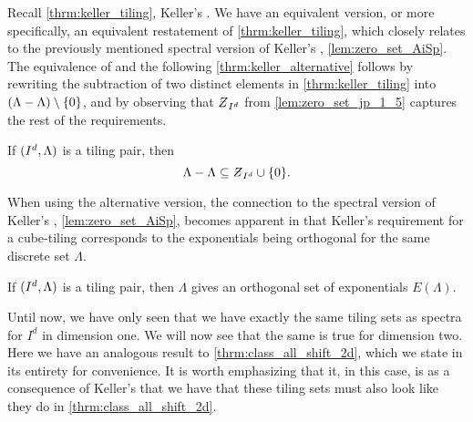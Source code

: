\documentclass[../thesis.tex]{subfiles}
\begin{document}
Recall \cref{thrm:keller_tiling}, Keller's . We have an equivalent version, or more specifically, an equivalent restatement of \cref{thrm:keller_tiling}, which closely relates to the previously mentioned spectral version of Keller's , \cref{lem:zero_set_AiSp}. The equivalence of  and the following \cref{thrm:keller_alternative} follows by rewriting the subtraction of two distinct elements in \cref{thrm:keller_tiling} into $(\Lambda-\Lambda)\setminus\{0\}$, and by observing that $\Zstroke_{I^d}$ from \cref{lem:zero_set_jp_1_5} captures the rest of the requirements.

\begin{theorem}\label{thrm:keller_alternative}
    If $(I^d,\Lambda)$ is a tiling pair, then 
    \begin{equation*}
        \Lambda - \Lambda \subseteq \Zstroke_{I^d} \cup \braq{0}.
    \end{equation*} 
\end{theorem}

When using the alternative version, the connection to the spectral version of Keller's , \cref{lem:zero_set_AiSp}, becomes apparent in that Keller's requirement for a cube-tiling corresponds to the exponentials being orthogonal for the same discrete set $\Lambda$.

\begin{corollary}\label{cor:tiling_pair_implies_orthogonal}
    If $(I^d, \Lambda)$ is a tiling pair, then $\Lambda$ gives an orthogonal set of exponentials $E(\Lambda)$.
\end{corollary}

Until now, we have only seen that we have exactly the same tiling sets as spectra for $I^d$ in dimension one. We will now see that the same is true for dimension two. Here we have an analogous result to \cref{thrm:class_all_shift_2d}, which we state in its entirety for convenience. It is worth emphasizing that it, in this case, is as a consequence of Keller's  that we have that these tiling sets must also look like they do in \cref{thrm:class_all_shift_2d}.
\end{document}
